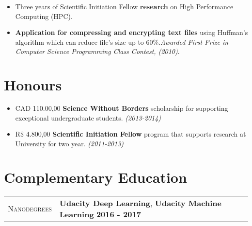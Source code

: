 \documentclass[9pt, a4paper, oneside, final]{scrartcl} %
\newcommand{\gray}{\rowcolor[gray]{.90}} %
\begin{document}
\begin{itemize}\itemsep1.0pt \parskip0pt 

\item Three years of Scientific Initiation Fellow \textbf{research} on High Performance Computing (HPC).

\item \textbf{Application for compressing and encrypting text files} using Huffman's algorithm which can reduce file’s size up to 60\%.\textit{Awarded First Prize in Computer Science Programming Class Contest, (2010)}.


\end{itemize}

\section{Honours}

\begin{itemize}\itemsep1.0pt \parskip0pt 
\item CAD 110.00,00 \textbf{Science Without Borders} scholarship for supporting exceptional undergraduate students. \textit{(2013-2014)}

\item R\$ 4.800,00 \textbf{Scientific Initiation Fellow} program that supports  research at University for two year.\textit{ (2011-2013)}
\end{itemize} 

\section{Complementary Education}

\begin{center}
\begin{tabularx}{1.0\linewidth}{>{\raggedleft\scshape}p{2.2cm}X}
\gray Nanodegrees & \textbf{Udacity Deep Learning}, \textbf{Udacity Machine Learning} \hfill \textbf{2016 - 2017}\\
\end{tabularx}
\end{center}
\end{document}

